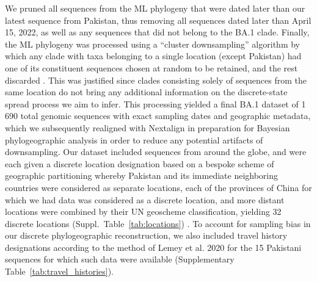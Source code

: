 We pruned all sequences from the ML phylogeny that were dated later than our latest sequence from Pakistan, thus removing all sequences dated later than April 15, 2022, as well as any sequences that did not belong to the BA.1 clade.
Finally, the ML phylogeny was processed using a ``cluster downsampling'' algorithm by which any clade with taxa belonging to a single location (except Pakistan) had one of its constituent sequences chosen at random to be retained, and the rest discarded \citep{hong2020search}.
This was justified since clades consisting solely of sequences from the same location do not bring any additional information on the discrete-state spread process we aim to infer.
This processing yielded a final BA.1 dataset of 1\,690 total genomic sequences with exact sampling dates and geographic metadata, which we subsequently realigned with Nextalign in preparation for Bayesian phylogeographic analysis in order to reduce any potential artifacts of downsampling.
Our dataset included sequences from around the globe, and were each given a discrete location designation based on a bespoke scheme of geographic partitioning whereby Pakistan and its immediate neighboring countries were considered as separate locations, each of the provinces of China for which we had data was considered as a discrete location, and more distant locations were combined by their UN geoscheme classification, yielding 32 discrete locations (Suppl.~Table~\ref{tab:locations}) \citep{unUNSDx2014}.
To account for sampling bias in our discrete phylogeographic reconstruction, we also included travel history designations according to the method of Lemey et al. 2020 \citep{lemey2020accommodating} for the 15 Pakistani sequences for which such data were available (Supplementary Table~\ref{tab:travel_histories}).

